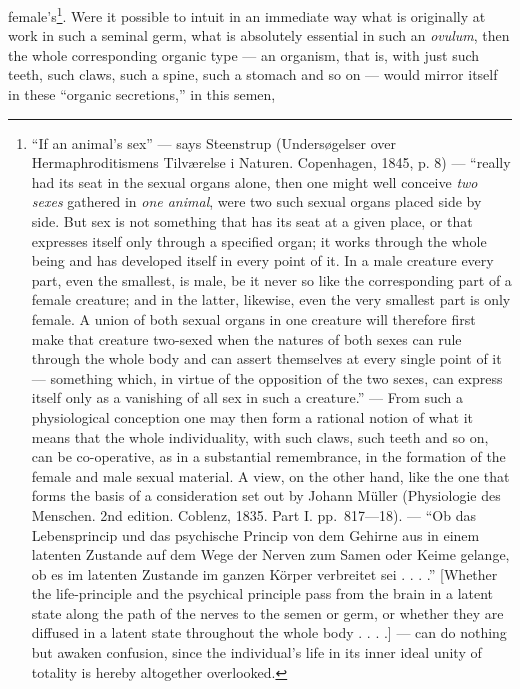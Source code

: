 \documentclass[12pt,a4paper]{book}
\begin{document}
female's\footnote{``If an animal's sex'' --- says Steenstrup (Undersøgelser
over Hermaphroditismens Tilværelse i Naturen. Copenhagen, 1845, p. 8) ---
``really had its seat in the sexual organs alone, then one might well conceive
\emph{two sexes} gathered in \emph{one animal}, were two such sexual organs
placed side by side. But sex is not something that has its seat at a given
place, or that expresses itself only through a specified organ; it works through
the whole being and has developed itself in every point of it. In a male
creature every part, even the smallest, is male, be it never so like the
corresponding part of a female creature; and in the latter, likewise, even the
very smallest part is only female. A union of both sexual organs in one creature
will therefore first make that creature two-sexed when the natures of both sexes
can rule through the whole body and can assert themselves at every single point
of it --- something which, in virtue of the opposition of the two sexes, can
express itself only as a vanishing of all sex in such a creature.'' --- From such
a physiological conception one may then form a rational notion of what it means
that the whole individuality, with such claws, such teeth and so on, can be
co-operative, as in a substantial remembrance, in the formation of the female
and male sexual material. A view, on the other hand, like the one that forms the
basis of a consideration set out by Johann Müller (Physiologie des Menschen.
2nd edition. Coblenz, 1835. Part I. pp.~817---18). --- ``Ob das Lebensprincip
und das psychische Princip von dem Gehirne aus in einem latenten Zustande auf
dem Wege der Nerven zum Samen oder Keime gelange, ob es im latenten Zustande im
ganzen Körper verbreitet sei . . . .'' [Whether the life-principle and the
psychical principle pass from the brain in a latent state along the path of the
nerves to the semen or germ, or whether they are diffused in a latent state
throughout the whole body . . . .] --- can do nothing but awaken confusion,
since the individual's life in its inner ideal unity of totality is hereby
altogether overlooked.}. Were it possible to intuit in an immediate way what is
originally at work in such a seminal germ, what is absolutely essential in such
an \textit{ovulum}, then the whole corresponding organic type --- an organism,
that is, with just such teeth, such claws, such a spine, such a stomach and so
on --- would mirror itself in these ``organic secretions,'' in this semen,
\end{document}
